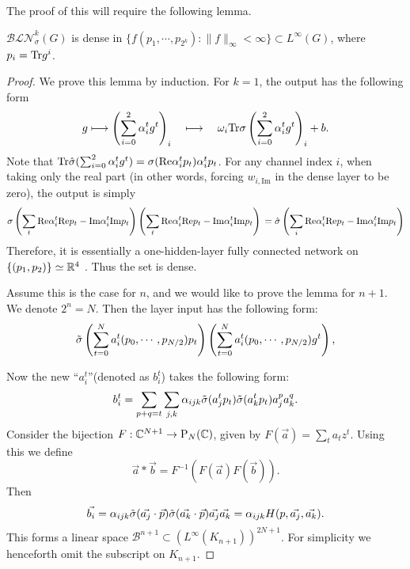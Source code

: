     The proof of this will require the following lemma.
    \begin{lemma}
$\mathcal{BLN}_{\sigma}^k(G)$ is dense in $\{f(p_1,\cdots,p_{2^k}):\|f\|_\infty<\infty\}\subset L^\infty(G)$, where $p_i=\text{Tr} g^i$.
\label{fundamentallemma}
    \end{lemma}
    \begin{proof}
        We prove this lemma by induction. For $k=1$, the output has the following form
        $$g\longmapsto \left(\sum_{i=0}^2 \alpha_i^t g^t\right)_i\quad  \longmapsto\quad \omega_i \text{Tr}\sigma\left(\sum_{i=0}^2 \alpha_i^t g^t\right)_i + b.$$
        Note that $\text{Tr}\hat{\sigma}(\sum_{i=0}^2 \alpha_i^t g^t)=\sigma(\textrm{Re}\alpha_i^tp_t)\alpha_i^tp_t$.
        For any channel index $i$, when taking only the real part (in other words, forcing $w_{i,\text{Im}}$ in the dense layer to be zero), the output is simply
        \begin{equation}
            \sigma\left(\sum_t\textrm{Re}\alpha_i^t \textrm{Re}p_t - \textrm{Im}\alpha_i^t \textrm{Im}p_t \right)\left(\sum_t\textrm{Re}\alpha_i^t \textrm{Re}p_t - \textrm{Im}\alpha_i^t \textrm{Im}p_t \right)\\
            =\hat{\sigma}\left(\sum_i\textrm{Re}\alpha_i^t \textrm{Re}p_t - \textrm{Im}\alpha_i^t \textrm{Im}p_t\right)
        \end{equation}
        Therefore, it is essentially a one-hidden-layer fully connected network on 
        $\{(p_1, p_2)\}\simeq\mathbb{R}^4$ . Thus the set is dense.
        
        Assume this is the case for $n$, and we would like to prove the lemma for $n+1$. We denote $2^n=N$. Then the layer input has the following form:
        $$\Tilde{\sigma}\left(\sum_{t=0}^{N}a_i^t(p_0,\cdots,p_{N/2})p_t\right)\left(\sum_{t=0}^{N}a_i^t(p_0,\cdots,p_{N/2})g^t\right),$$

        Now the new ``$a^t_i$''(denoted as $b^t_i$) takes the following form:
        $$b_i^t=\sum_{p+q=t}\sum_{j,k}\alpha_{ijk}\Tilde{\sigma}(a_j^tp_t)\Tilde{\sigma}(a_k^tp_t)a_j^p a_k^q.$$
        Consider the bijection $F:\mathbb{C}^{N+1}\rightarrow \mathrm{P}_N(\mathbb{C})$, given by $F(\Vec{a})=\sum_{t}a_tz^t$. Using this we define 
        $$\Vec{a} * \Vec{b} = F^{-1}(F(\Vec{a})F(\Vec{b})).$$
        Then $$\Vec{b_i}=\alpha_{ijk}\Tilde{\sigma}(\Vec{a_j}\cdot \Vec{p})\Tilde{\sigma}(\Vec{a_k}\cdot \Vec{p})\Vec{a_j}\Vec{a_k}=\alpha_{ijk}H(p, \Vec{a_j}, \Vec{a_k}).$$
        This forms a linear space $\mathcal{B}^{n+1}\subset (L^\infty(K_{n+1}))^{2N+1}$. For simplicity we henceforth omit the subscript on $K_{n+1}$. 
        

\end{proof}

